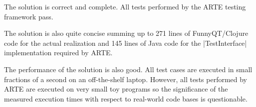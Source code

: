 \documentclass[submission]{eptcs}
\newcommand{\code}{\clojureinline}
\begin{document}
The solution is correct and complete.  All tests performed by the ARTE testing
framework pass.

The solution is also quite concise summing up to 271 lines of FunnyQT/Clojure
code for the actual realization and 145 lines of Java code for the
\code|TestInterface| implementation required by ARTE.

The performance of the solution is also good.  All test cases are executed in
small fractions of a second on an off-the-shelf laptop.  However, all tests
performed by ARTE are executed on very small toy programs so the significance
of the measured execution times with respect to real-world code bases is
questionable.



\end{document}
